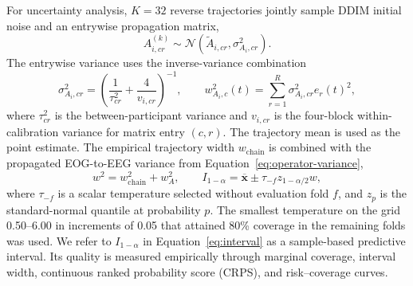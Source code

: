 For uncertainty analysis, $K=32$ reverse trajectories jointly sample DDIM initial noise and an entrywise propagation matrix,
\begin{equation}
  A^{(k)}_{i,cr}\sim
  \mathcal{N}\!\left(\widetilde A_{i,cr},\sigma^2_{A_i,cr}\right).
  \label{eq:operator-sample}
\end{equation}
The entrywise variance uses the inverse-variance combination
\begin{equation}
  \sigma^2_{A_i,cr}=\left(\frac{1}{\tau^2_{cr}}+\frac{4}{v_{i,cr}}\right)^{-1},
  \qquad
  w^2_{A_i,c}(t)=\sum_{r=1}^{R}\sigma^2_{A_i,cr}e_r(t)^2,
  \label{eq:operator-variance}
\end{equation}
where $\tau^2_{cr}$ is the between-participant variance and $v_{i,cr}$ is the four-block within-calibration variance for matrix entry $(c,r)$. The trajectory mean is used as the point estimate. The empirical trajectory width $w_{\mathrm{chain}}$ is combined with the propagated EOG-to-EEG variance from Equation~\ref{eq:operator-variance},
\begin{equation}
  w^2=w_{\mathrm{chain}}^2+w_A^2,
  \qquad
  I_{1-\alpha}=\overline{\mathbf{x}}
  \mathbin{\pm} \tau_{-f}z_{1-\alpha/2}w,
  \label{eq:interval}
\end{equation}
where $\tau_{-f}$ is a scalar temperature selected without evaluation fold $f$, and $z_p$ is the standard-normal quantile at probability $p$. The smallest temperature on the grid 0.50--6.00 in increments of 0.05 that attained 80\% coverage in the remaining folds was used. We refer to $I_{1-\alpha}$ in Equation~\ref{eq:interval} as a sample-based predictive interval. Its quality is measured empirically through marginal coverage, interval width, continuous ranked probability score (CRPS), and risk--coverage curves.
